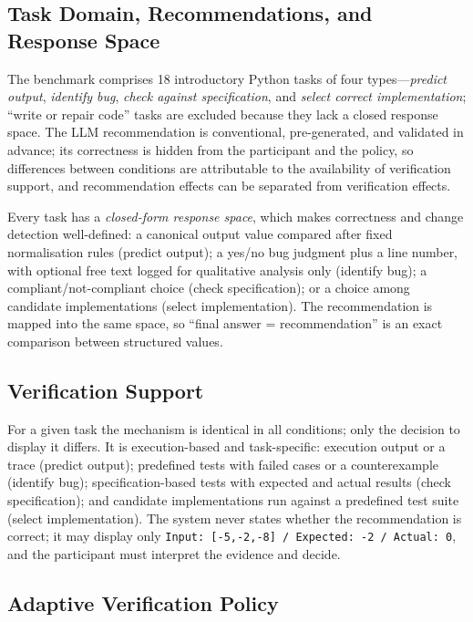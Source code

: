 \documentclass[oneside,final,14pt,a4paper]{extreport}
\begin{document}
\subsection{Task Domain, Recommendations, and Response Space}
\label{subsec:answerspace}

The benchmark comprises 18 introductory Python tasks of four
types---\emph{predict output}, \emph{identify bug}, \emph{check against
specification}, and \emph{select correct implementation}; ``write or repair
code'' tasks are excluded because they lack a closed response space. The LLM
recommendation is conventional, pre-generated, and validated in advance; its
correctness is hidden from the participant and the policy, so differences
between conditions are attributable to the availability of verification
support, and recommendation effects can be separated from verification
effects.

Every task has a \emph{closed-form response space}, which makes correctness
and change detection well-defined: a canonical output value compared after
fixed normalisation rules (predict output); a yes/no bug judgment plus a line
number, with optional free text logged for qualitative analysis only (identify
bug); a compliant/not-compliant choice (check specification); or a choice
among candidate implementations (select implementation). The recommendation is
mapped into the same space, so ``final answer = recommendation'' is an exact
comparison between structured values.

\subsection{Verification Support}

For a given task the mechanism is identical in all conditions; only the
decision to display it differs. It is execution-based and task-specific:
execution output or a trace (predict output); predefined tests with failed
cases or a counterexample (identify bug); specification-based tests with
expected and actual results (check specification); and candidate
implementations run against a predefined test suite (select implementation).
The system never states whether the recommendation is correct; it may display
only \texttt{Input: [-5,-2,-8] / Expected: -2 / Actual: 0}, and the
participant must interpret the evidence and decide.

\subsection{Adaptive Verification Policy}
\label{subsec:policy}
\label{subsec:premise}
\end{document}
